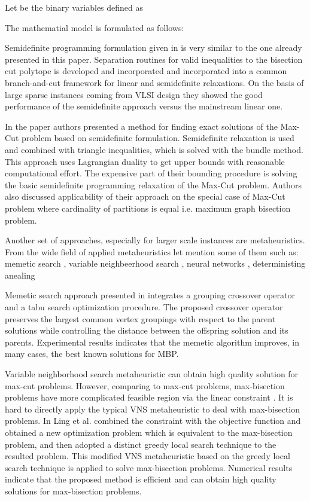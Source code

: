 \documentclass[10pt]{article}
\begin{document}
Let  be the binary variables defined as  



The mathematial model is formulated as follows:




Semidefinite programming formulation given in \cite{armb} is very similar to the one
already presented in this paper. 
Separation routines
for valid inequalities to the bisection cut polytope 
is developed and incorporated 
and incorporated into a common branch-and-cut framework for linear and semidefinite relaxations.
On the basis of large sparse instances coming from VLSI design they
showed the good performance of the semidefinite approach versus the mainstream
linear one.






In the paper \cite{rendl} authors presented a method for finding exact solutions of the Max-Cut problem
based on semidefinite formulation. 
Semidefinite relaxation is used and combined with triangle inequalities,
which is  solved with the bundle method. This approach uses Lagrangian duality to get upper 
bounds with reasonable computational effort. 
The expensive part of their bounding procedure is solving the basic semidefinite
programming relaxation of the Max-Cut problem. 
Authors also discussed applicability of their approach on the special case 
of Max-Cut problem where cardinality of partitions is equal i.e.
maximum graph bisection problem.  




Another set of approaches, especially for larger scale instances
are metaheuristics. 
From the wide field of applied metaheuristics
let mention some of them such as: memetic search \cite{wu}, variable
neighbeerhood search \cite{ling}, neural networks \cite{fengmin}, 
deterministing anealing \cite{dang}

Memetic search approach presented in \cite{wu} 
integrates a grouping crossover operator and a tabu search optimization procedure.
The proposed crossover operator preserves the largest common vertex groupings
with respect to the parent solutions while controlling the distance between the
offspring solution and its parents. Experimental results indicates that the 
memetic algorithm improves, in
many cases, the best known solutions for MBP.

Variable neighborhood search metaheuristic can obtain high quality solution for max-cut problems.
However, comparing to max-cut problems, max-bisection problems have more complicated feasible 
region via the linear constraint . It is hard to directly apply the
typical VNS metaheuristic to deal with max-bisection problems. In \cite{ling} Ling et al.
combined the constraint  with the objective function and  
obtained a new optimization problem which is equivalent to the max-bisection problem, 
and then adopted a distinct greedy local search technique to the resulted problem. 
This modified VNS metaheuristic based on the greedy local search technique
is applied to solve max-bisection problems. 
Numerical results indicate that the proposed method is efficient and can obtain high
quality solutions for max-bisection problems.
\end{document}

